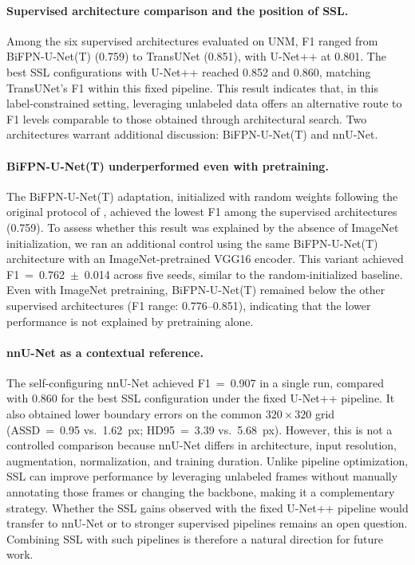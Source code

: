 \documentclass[a4paper,fleqn]{cas-dc}
\begin{document}
\paragraph{Supervised architecture comparison and the position of SSL.}
Among the six supervised architectures evaluated on UNM, F1 ranged from BiFPN-U-Net(T) (0.759) to TransUNet (0.851), with U-Net++ at 0.801. The best SSL configurations with U-Net++ reached 0.852 and 0.860, matching TransUNet's F1 within this fixed pipeline. This result indicates that, in this label-constrained setting, leveraging unlabeled data offers an alternative route to F1 levels comparable to those obtained through architectural search. Two architectures warrant additional discussion: BiFPN-U-Net(T) and nnU-Net.

\paragraph{BiFPN-U-Net(T) underperformed even with pretraining.}
The BiFPN-U-Net(T) adaptation, initialized with random weights following the original protocol of \citet{ref_kim2021}, achieved the lowest F1 among the supervised architectures (0.759). To assess whether this result was explained by the absence of ImageNet initialization, we ran an additional control using the same BiFPN-U-Net(T) architecture with an ImageNet-pretrained VGG16 encoder. This variant achieved F1~=~0.762~$\pm$~0.014 across five seeds, similar to the random-initialized baseline. Even with ImageNet pretraining, BiFPN-U-Net(T) remained below the other supervised architectures (F1 range: 0.776--0.851), indicating that the lower performance is not explained by pretraining alone.

\paragraph{nnU-Net as a contextual reference.}
The self-configuring nnU-Net achieved F1~=~0.907 in a single run, compared with 0.860 for the best SSL configuration under the fixed U-Net++ pipeline. It also obtained lower boundary errors on the common $320{\times}320$ grid (ASSD~=~0.95 vs.\ 1.62~px; HD95~=~3.39 vs.\ 5.68~px).
However, this is not a controlled comparison because nnU-Net differs in architecture, input resolution, augmentation, normalization, and training duration.
Unlike pipeline optimization, SSL can improve performance by leveraging unlabeled frames without manually annotating those frames or changing the backbone, making it a complementary strategy. Whether the SSL gains observed with the fixed U-Net++ pipeline would transfer to nnU-Net or to stronger supervised pipelines remains an open question. Combining SSL with such pipelines is therefore a natural direction for future work.
\end{document}
